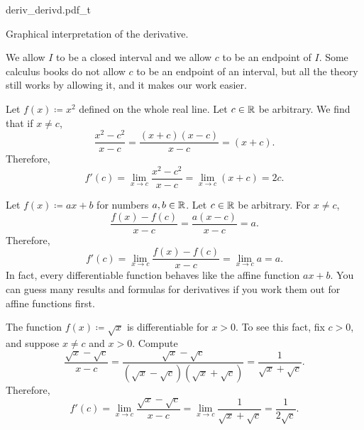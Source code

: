 \begin{myfigureht}
{deriv_derivd.pdf_t}
\caption{Graphical interpretation of the derivative.\label{derivfig}}
\end{myfigureht}

We allow $I$ to be a closed interval and we allow
$c$ to be an endpoint of $I$.  Some calculus books do not allow $c$ to be an
endpoint of an interval, but all the theory still works by allowing it, and
it makes our work easier.

\begin{example}
Let $f(x) \coloneqq x^2$ defined on the whole real line.  Let $c \in {\mathbb{R}}$ be arbitrary.  We find that if
$x \not=c$,
\begin{equation*}
\frac{x^2-c^2}{x-c} =
\frac{(x+c)(x-c)}{x-c} =
(x+c) .
\end{equation*}
Therefore,
\begin{equation*}
f'(c) = 
\lim_{x\to c} \frac{x^2-c^2}{x-c} =
\lim_{x\to c} (x+c) = 2c.
\end{equation*}
\end{example}

\begin{example}
Let $f(x) \coloneqq ax + b$ for numbers $a, b \in {\mathbb{R}}$.
Let $c \in {\mathbb{R}}$ be arbitrary.
For $x \not=c$,
\begin{equation*}
\frac{f(x)-f(c)}{x-c} =
\frac{a(x-c)}{x-c} = a .
\end{equation*}
Therefore,
\begin{equation*}
f'(c) =
\lim_{x\to c} 
\frac{f(x)-f(c)}{x-c} =
\lim_{x\to c} 
a = a.
\end{equation*}
In fact, every differentiable function  behaves like
the affine function $ax + b$.  You can guess many results
and formulas for derivatives if you work them out for affine functions
first.
\end{example}

\begin{example}
The function $f(x) \coloneqq \sqrt{x}$ is differentiable for $x > 0$.  To see this
fact, fix $c > 0$,
and suppose $x \not= c$ and $x > 0$.  Compute
\begin{equation*}
\frac{\sqrt{x}-\sqrt{c}}{x-c}
=
\frac{\sqrt{x}-\sqrt{c}}{(\sqrt{x}-\sqrt{c})(\sqrt{x}+\sqrt{c})}
=
\frac{1}{\sqrt{x}+\sqrt{c}} .
\end{equation*}
Therefore,
\begin{equation*}
f'(c) =
\lim_{x\to c}
\frac{\sqrt{x}-\sqrt{c}}{x-c}
=
\lim_{x\to c}
\frac{1}{\sqrt{x}+\sqrt{c}}
=
\frac{1}{2\sqrt{c}} .
\end{equation*}
\end{example}

